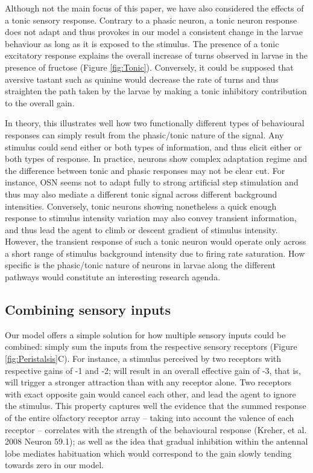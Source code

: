 \documentclass[11pt,a4paper]{article}
\begin{document}
Although not the main focus of this paper, we have also considered the effects of a tonic sensory response. Contrary to a phasic neuron, a tonic neuron response does not adapt and thus provokes in our model a consistent change in the larvae behaviour as long as it is exposed to the stimulus. The presence of a tonic excitatory response explains the overall increase of turns observed in larvae in the presence of fructose (Figure \ref{fig:Tonic}). Conversely, it could be supposed that aversive tastant such as quinine would decrease the rate of turns and thus straighten the path taken by the larvae by making a tonic inhibitory contribution to the overall gain. 

In theory, this illustrates well how two functionally different types of behavioural responses can simply result from the phasic/tonic nature of the signal. Any stimulus could send either or both types of information, and thus elicit either or both types of response. In practice, neurons show complex adaptation regime and the difference between tonic and phasic responses may not be clear cut. For instance, OSN seems not to adapt fully to strong artificial step stimulation \citep{nagel2011biophysical,schulze2015dynamical} and thus may also mediate a different tonic signal across different background intensities. Conversely, tonic neurons showing nonetheless a quick enough response to stimulus intensity variation may also convey transient information, and thus lead the agent to climb or descent gradient of stimulus intensity. However, the transient response of such a tonic neuron would operate only across a short range of stimulus background intensity due to firing rate saturation. How specific is the phasic/tonic nature of neurons in larvae along the different pathways would constitute an interesting research agenda.

\subsection{Combining sensory inputs}
Our model offers a simple solution for how multiple sensory inputs could be combined: simply sum the inputs from the respective sensory receptors (Figure \ref{fig:Peristalsis}C). For instance, a stimulus perceived by two receptors with respective gains of -1 and -2; will result in an overall effective gain of -3, that is, will trigger a stronger attraction than with any receptor alone. Two receptors with exact opposite gain would cancel each other, and lead the agent to ignore the stimulus. This property captures well the evidence that the summed response of the entire olfactory receptor array – taking into account the valence of each receptor – correlates with the strength of the behavioural response (Kreher, et al. 2008 Neuron 59.1); as well as the idea that gradual inhibition within the antennal lobe mediates habituation \citep{das2011plasticity} which would correspond to the gain slowly tending towards zero in our model. 
\end{document}
